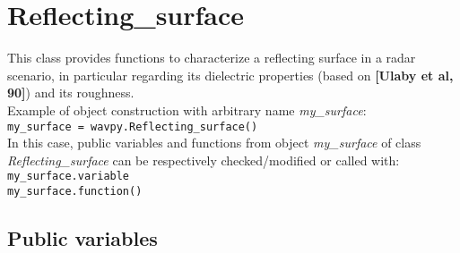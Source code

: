 \chapter{Reflecting\_surface}\label{cha:surf}

This class provides functions to characterize a reflecting surface in a radar scenario, in particular regarding its dielectric properties (based on {\bf [Ulaby et al, 90]}) and its roughness.\\

Example of object construction with arbitrary name {\it my\_surface}:\\

\texttt{my\_surface = wavpy.Reflecting\_surface()}\\

In this case, public variables and functions from object {\it my\_surface} of class {\it Reflecting\_surface} can be respectively checked/modified or called with:\\

\texttt{my\_surface.variable}\\

\texttt{my\_surface.function()}\\


\section{Public variables}

